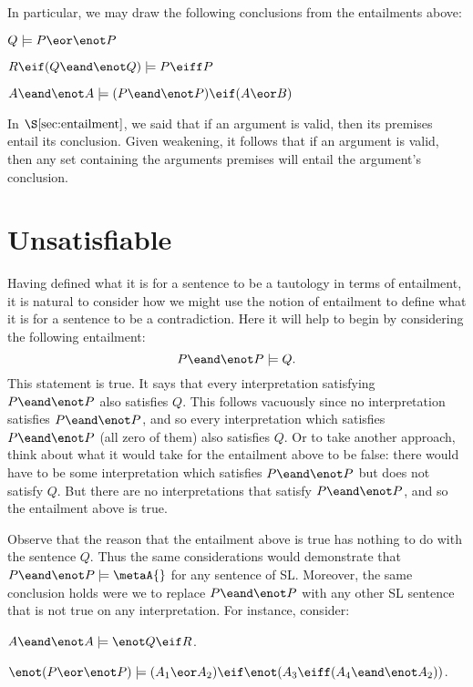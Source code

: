 In particular, we may draw the following conclusions from the entailments above:

\begin{earg}
  \item[] $Q \models P \eor \enot P$
  \item[] $R \eif (Q \eand \enot Q)\models P \eiff P$
  \item[] $A \eand \enot A \models (P \eand\enot P)\eif (A \eor B)$
\end{earg}

In $\S\ref{sec:entailment}$, we said that if an argument is valid, then its premises entail its conclusion.
Given weakening, it follows that if an argument is valid, then any set containing the arguments premises will entail the argument's conclusion.




\section{Unsatisfiable}

Having defined what it is for a sentence to be a tautology in terms of entailment, it is natural to consider how we might use the notion of entailment to define what it is for a sentence to be a contradiction.
Here it will help to begin by considering the following entailment:
$$P \eand \enot P \models Q.$$
This statement is true.
It says that every interpretation satisfying $P \eand \enot P$ also satisfies $Q$.
This follows vacuously since no interpretation satisfies $P \eand \enot P$, and so every interpretation which satisfies $P \eand \enot P$ (all zero of them) also satisfies $Q$.
Or to take another approach, think about what it would take for the entailment above to be false: there would have to be some interpretation which satisfies $P \eand \enot P$ but does not satisfy $Q$.
But there are no interpretations that satisfy $P \eand \enot P$, and so the entailment above is true.

Observe that the reason that the entailment above is true has nothing to do with the sentence $Q$.
Thus the same considerations would demonstrate that $P \eand \enot P \models \metaA{}$ for any sentence \metaA{} of SL.
Moreover, the same conclusion holds were we to replace $P \eand \enot P$ with any other SL sentence that is not true on any interpretation.
For instance, consider:

\begin{earg}
\item[] $A \eand \enot A \models \enot Q \eif R$.
\item[] $\enot (P \eor \enot P) \models (A_1 \eor A_2) \eif \enot (A_3 \eiff (A_4 \eand \enot A_2))$.
\end{earg}

